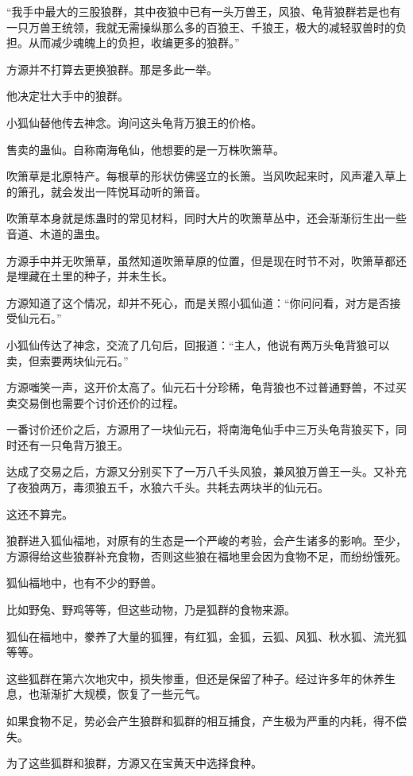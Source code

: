 \begin{this_body}
“我手中最大的三股狼群，其中夜狼中已有一头万兽王，风狼、龟背狼群若是也有一只万兽王统领，我就无需操纵那么多的百狼王、千狼王，极大的减轻驭兽时的负担。从而减少魂魄上的负担，收编更多的狼群。”

方源并不打算去更换狼群。那是多此一举。

他决定壮大手中的狼群。

小狐仙替他传去神念。询问这头龟背万狼王的价格。

售卖的蛊仙。自称南海龟仙，他想要的是一万株吹箫草。

吹箫草是北原特产。每根草的形状仿佛竖立的长箫。当风吹起来时，风声灌入草上的箫孔，就会发出一阵悦耳动听的箫音。

吹箫草本身就是炼蛊时的常见材料，同时大片的吹箫草丛中，还会渐渐衍生出一些音道、木道的蛊虫。

方源手中并无吹箫草，虽然知道吹箫草原的位置，但是现在时节不对，吹箫草都还是埋藏在土里的种子，并未生长。

方源知道了这个情况，却并不死心，而是关照小狐仙道：“你问问看，对方是否接受仙元石。”

小狐仙传达了神念，交流了几句后，回报道：“主人，他说有两万头龟背狼可以卖，但索要两块仙元石。”

方源嗤笑一声，这开价太高了。仙元石十分珍稀，龟背狼也不过普通野兽，不过买卖交易倒也需要个讨价还价的过程。

一番讨价还价之后，方源用了一块仙元石，将南海龟仙手中三万头龟背狼买下，同时还有一只龟背万狼王。

达成了交易之后，方源又分别买下了一万八千头风狼，兼风狼万兽王一头。又补充了夜狼两万，毒须狼五千，水狼六千头。共耗去两块半的仙元石。

这还不算完。

狼群进入狐仙福地，对原有的生态是一个严峻的考验，会产生诸多的影响。至少，方源得给这些狼群补充食物，否则这些狼在福地里会因为食物不足，而纷纷饿死。

狐仙福地中，也有不少的野兽。

比如野兔、野鸡等等，但这些动物，乃是狐群的食物来源。

狐仙在福地中，豢养了大量的狐狸，有红狐，金狐，云狐、风狐、秋水狐、流光狐等等。

这些狐群在第六次地灾中，损失惨重，但还是保留了种子。经过许多年的休养生息，也渐渐扩大规模，恢复了一些元气。

如果食物不足，势必会产生狼群和狐群的相互捕食，产生极为严重的内耗，得不偿失。

为了这些狐群和狼群，方源又在宝黄天中选择食种。


\end{this_body}
